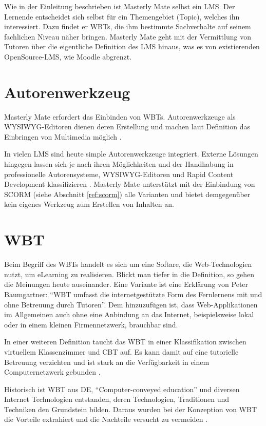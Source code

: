 Wie in der Einleitung beschrieben ist Masterly Mate selbst ein LMS. Der Lernende
entscheidet sich selbst für ein Themengebiet (Topic), welches ihn interessiert.
Dazu findet er WBTs, die ihm bestimmte Sachverhalte auf seinem fachlichen Niveau
näher bringen. Masterly Mate geht mit der Vermittlung von Tutoren über die
eigentliche Definition des LMS hinaus, was es von existierenden OpenSource-LMS,
wie Moodle abgrenzt.

\section{Autorenwerkzeug}
Masterly Mate erfordert das Einbinden von WBTs. Autorenwerkzeuge als
\ac{WYSIWYG}-Editoren dienen deren Erstellung und machen laut Definition das
Einbringen von Multimedia möglich \cite{niegemann:2004}. 

In vielen LMS sind heute simple Autorenwerkzeuge integriert. Externe Lösungen
hingegen lassen sich je nach ihren Möglichkeiten und der Handhabung in
professionelle Autorensysteme, WYSIWYG-Editoren und Rapid Content Development
klassifizieren \cite{niegemann:2004}. Masterly Mate unterstützt mit der
Einbindung von SCORM (siehe Abschnitt \ref{ref:scorm}) alle Varianten und bietet
demgegenüber kein eigenes Werkzeug zum Erstellen von Inhalten an.

\section{WBT}
Beim Begriff des WBTs handelt es sich um eine Softare, die Web-Technologien
nutzt, um eLearning zu realisieren. Blickt man tiefer in die Definition, so
gehen die Meinungen heute auseinander. Eine Variante ist eine Erklärung von
Peter Baumgartner: "`WBT umfasst die internetgestützte Form des Fernlernens mit
und ohne Betreuung durch Tutoren"'\cite{baumgartner:2002}. Dem hinzuzufügen ist,
dass Web-Applikationen im Allgemeinen auch ohne eine Anbindung an das Internet,
beispielsweise lokal oder in einem kleinen Firmennetzwerk, brauchbar sind. 

In einer weiteren Definition taucht das WBT in einer Klassifikation zwischen
virtuellem Klassenzimmer und \ac{CBT} auf. Es kann damit auf eine tutorielle
Betreuung verzichten und ist stark an die Verfügbarkeit in einem
Computernetzwerk gebunden \cite{schleifer:2003}.

Historisch ist WBT aus \ac{DE}, "`Computer-conveyed education"' und diversen
Internet Technologien entstanden, deren Technologien, Traditionen und Techniken
den Grundstein bilden. Daraus wurden bei der Konzeption von WBT die Vorteile
extrahiert und die Nachteile versucht zu vermeiden \cite{horton:2000}.

